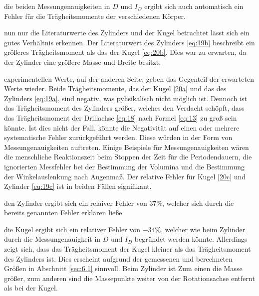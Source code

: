 \justifying die beiden Messungenauigkeiten in $D$ und $I_D$ ergibt
sich auch automatisch ein Fehler für die Trägheitsmomente der verschiedenen Körper.

\justifying nun nur die Literaturwerte des Zylinders und der Kugel betrachtet lässt sich ein gutes Verhältnis erkennen.
Der Literaturwert des Zylinders \eqref{eq:19b} beschreibt ein größeres Trägheitsmoment als das der Kugel \eqref{eq:20b}. Dies war zu erwarten,
da der Zylinder eine größere Masse und Breite besitzt. 

\justifying experimentellen Werte, auf der anderen Seite, geben das Gegenteil der erwarteten Werte wieder. Beide Trägheitsmomente, 
das der Kugel \eqref{20a} und das des Zylinders \eqref{eq:19a}, sind negativ, was pyhsikalisch nicht möglich ist. Dennoch ist das Trägheitsmoment 
des Zylinders größer, welches den Verdacht schöpft, dass das Trägheitsmoment der Drillachse \eqref{eq:18} nach Formel \eqref{eq:13} zu groß 
sein könnte. Ist dies nicht der Fall, könnte die Negativität auf einen oder mehrere systematische Fehler zurückgeführt werden. Diese würden 
in der Form von Messungenauigkeiten auftreten. Einige Beispiele für Messungenauigkeiten wären die menschliche Reaktionszeit beim Stoppen der Zeit
für die Periodendauern, die ignorierten Messfehler bei der Bestimmung der Volumina und die Bestimmung der Winkelauslenkung nach Augenmaß.
Der relative Fehler für Kugel \eqref{20c} und Zylinder \eqref{eq:19c} ist in beiden Fällen signifikant. 


\justifying den Zylinder ergibt sich ein relaiver Fehler von $37\%$, welcher  sich
durch die bereits genannten Fehler erklären ließe. 


\justifying die Kugel ergibt sich ein relativer Fehler von $-34\%$, welcher wie beim Zylinder durch
die Messungenauigkeit in $D$ und $I_D$ begründet werden könnte.
Allerdings zeigt sich, dass das Trägheitsmoment der Kugel kleiner als das Trägheitsmoment
des Zylinders ist. Dies erscheint aufgrund der gemessenen und berechneten Größen in Abschnitt \ref{sec:6.1}
sinnvoll. Beim Zylinder ist Zum einen die Masse größer, zum  anderen sind die Massepunkte weiter 
von der Rotationsachse entfernt als bei der Kugel.
\newpage

